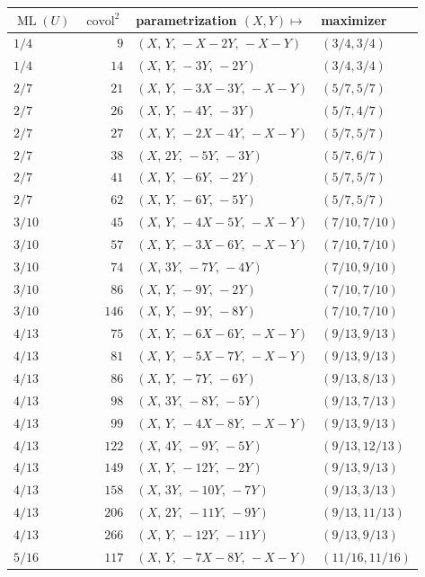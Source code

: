 \documentclass[12pt]{amsart}
\theoremstyle{definition}\newtheorem{definition}[theorem]{Definition}
\theoremstyle{remark}\newtheorem{remark}[theorem]{Remark}
\newcommand{\ML}{\operatorname{ML}}
\newcommand{\covol}{\operatorname{covol}}
\begin{document}
\begin{table}[H]
\centering\small
\begin{tabular}{l r l l}
\toprule
$\ML(U)$ & $\covol^2$ & parametrization $(X,Y)\mapsto$ & maximizer\\\midrule
$1/4$ & $9$ & $(X,\,Y,\,-X-2Y,\,-X-Y)$ & $(3/4,3/4)$ \\
$1/4$ & $14$ & $(X,\,Y,\,-3Y,\,-2Y)$ & $(3/4,3/4)$ \\
$2/7$ & $21$ & $(X,\,Y,\,-3X-3Y,\,-X-Y)$ & $(5/7,5/7)$ \\
$2/7$ & $26$ & $(X,\,Y,\,-4Y,\,-3Y)$ & $(5/7,4/7)$ \\
$2/7$ & $27$ & $(X,\,Y,\,-2X-4Y,\,-X-Y)$ & $(5/7,5/7)$ \\
$2/7$ & $38$ & $(X,\,2Y,\,-5Y,\,-3Y)$ & $(5/7,6/7)$ \\
$2/7$ & $41$ & $(X,\,Y,\,-6Y,\,-2Y)$ & $(5/7,5/7)$ \\
$2/7$ & $62$ & $(X,\,Y,\,-6Y,\,-5Y)$ & $(5/7,5/7)$ \\
$3/10$ & $45$ & $(X,\,Y,\,-4X-5Y,\,-X-Y)$ & $(7/10,7/10)$ \\
$3/10$ & $57$ & $(X,\,Y,\,-3X-6Y,\,-X-Y)$ & $(7/10,7/10)$ \\
$3/10$ & $74$ & $(X,\,3Y,\,-7Y,\,-4Y)$ & $(7/10,9/10)$ \\
$3/10$ & $86$ & $(X,\,Y,\,-9Y,\,-2Y)$ & $(7/10,7/10)$ \\
$3/10$ & $146$ & $(X,\,Y,\,-9Y,\,-8Y)$ & $(7/10,7/10)$ \\
$4/13$ & $75$ & $(X,\,Y,\,-6X-6Y,\,-X-Y)$ & $(9/13,9/13)$ \\
$4/13$ & $81$ & $(X,\,Y,\,-5X-7Y,\,-X-Y)$ & $(9/13,9/13)$ \\
$4/13$ & $86$ & $(X,\,Y,\,-7Y,\,-6Y)$ & $(9/13,8/13)$ \\
$4/13$ & $98$ & $(X,\,3Y,\,-8Y,\,-5Y)$ & $(9/13,7/13)$ \\
$4/13$ & $99$ & $(X,\,Y,\,-4X-8Y,\,-X-Y)$ & $(9/13,9/13)$ \\
$4/13$ & $122$ & $(X,\,4Y,\,-9Y,\,-5Y)$ & $(9/13,12/13)$ \\
$4/13$ & $149$ & $(X,\,Y,\,-12Y,\,-2Y)$ & $(9/13,9/13)$ \\
$4/13$ & $158$ & $(X,\,3Y,\,-10Y,\,-7Y)$ & $(9/13,3/13)$ \\
$4/13$ & $206$ & $(X,\,2Y,\,-11Y,\,-9Y)$ & $(9/13,11/13)$ \\
$4/13$ & $266$ & $(X,\,Y,\,-12Y,\,-11Y)$ & $(9/13,9/13)$ \\
$5/16$ & $117$ & $(X,\,Y,\,-7X-8Y,\,-X-Y)$ & $(11/16,11/16)$ \\

\end{tabular}
\end{table}
\end{document}
